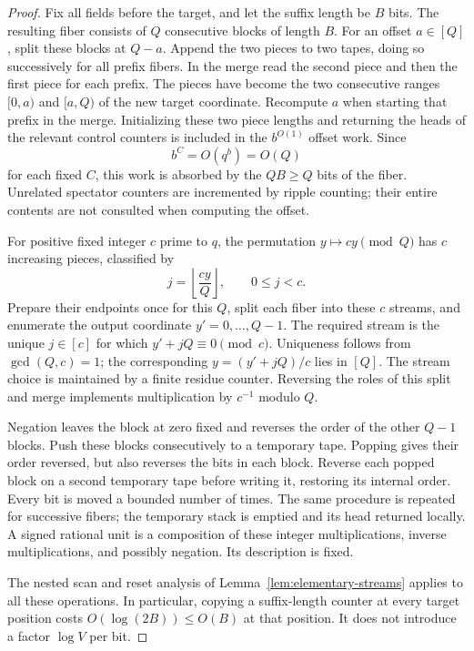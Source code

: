 \begin{proof}
Fix all fields before the target, and let the suffix length be $B$ bits.
The resulting fiber consists of $Q$ consecutive blocks of length $B$.
For an offset $a\in[Q]$, split these blocks at $Q-a$.  Append the two
pieces to two tapes, doing so successively for all prefix fibers.  In the
merge read the second piece and then the first piece for each prefix.
The pieces have become the two consecutive ranges $[0,a)$ and $[a,Q)$
of the new target coordinate.  Recompute $a$ when starting that prefix in
the merge.  Initializing these two piece lengths and returning the heads
of the relevant control counters is included in the $b^{O(1)}$ offset
work.  Since
\[
 b^C=O(q^b)=O(Q)
\]
for each fixed $C$, this work is absorbed by the $QB\ge Q$ bits of the
fiber.  Unrelated spectator counters are incremented by ripple counting;
their entire contents are not consulted when computing the offset.

For positive fixed integer $c$ prime to $q$, the permutation
$y\mapsto cy\pmod Q$ has $c$ increasing pieces, classified by
\[
 j=\left\lfloor\frac{cy}{Q}\right\rfloor,
 \qquad 0\le j<c.
\]
Prepare their endpoints once for this $Q$, split each fiber into these
$c$ streams, and enumerate the output coordinate $y'=0,\ldots,Q-1$.
The required stream is the unique $j\in[c]$ for which
$y'+jQ\equiv0\pmod c$.  Uniqueness follows from $\gcd(Q,c)=1$;
the corresponding $y=(y'+jQ)/c$ lies in $[Q]$.  The stream choice is
maintained by a finite residue counter.  Reversing the roles of this
split and merge implements multiplication by $c^{-1}$ modulo $Q$.

Negation leaves the block at zero fixed and reverses the order of the
other $Q-1$ blocks.  Push these blocks consecutively to a temporary tape.
Popping gives their order reversed, but also reverses the bits in each
block.  Reverse each popped block on a second temporary tape before
writing it, restoring its internal order.  Every bit is moved a bounded
number of times.  The same procedure is repeated for successive fibers;
the temporary stack is emptied and its head returned locally.  A signed
rational unit is a composition of these integer multiplications, inverse
multiplications, and possibly negation.  Its description is fixed.

The nested scan and reset analysis of
Lemma~\ref{lem:elementary-streams} applies to all these operations.  In
particular, copying a suffix-length counter at every target position
costs $O(\log(2B))\le O(B)$ at that position.  It does not introduce a
factor $\log V$ per bit.
\end{proof}

